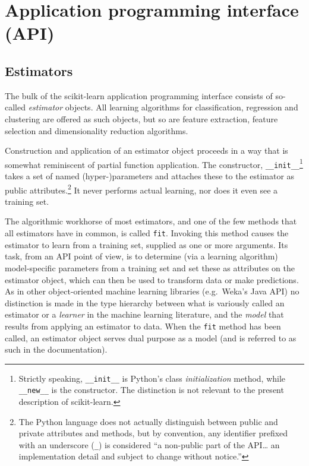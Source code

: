 \documentclass[a4paper]{article}
\begin{document}
\section{Application programming interface (API)}

\subsection{Estimators}


The bulk of the scikit-learn application programming interface
consists of so-called \textit{estimator} objects.
All learning algorithms for classification, regression and clustering
are offered as such objects,
but so are feature extraction, feature selection and dimensionality reduction
algorithms.

Construction and application of an estimator object
proceeds in a way that is somewhat reminiscent of partial function application.
The constructor, \texttt{\_\_init\_\_}\footnote{
  Strictly speaking, \texttt{\_\_init\_\_} is Python's
  class \textit{initialization} method,
  while \texttt{\_\_new\_\_} is the constructor.
  The distinction is not relevant to the present description of scikit-learn.}
takes a set of named (hyper-)parameters
and attaches these to the estimator as public attributes.\footnote{
  The Python language does not actually distinguish between public and private
  attributes and methods,
  but by convention, any identifier prefixed with an underscore (\texttt{\_})
  is considered ``a non-public part of the API\ldots
  an implementation detail and subject to change without notice.''
  }
It never performs actual learning, nor does it even see a training set.

The algorithmic workhorse of most estimators, and one of the few methods
that all estimators have in common, is called \texttt{fit}.
Invoking this method causes the estimator to learn from a training set,
supplied as one or more arguments.
Its task, from an API point of view,
is to determine (via a learning algorithm) model-specific parameters
from a training set and set these as attributes on the estimator object,
which can then be used to transform data or make predictions.
As in other object-oriented machine learning libraries
(e.g.\ Weka's Java API)
no distinction is made in the type hierarchy
between what is variously called an estimator or a \textit{learner}
in the machine learning literature,
and the \textit{model} that results from applying an estimator to data.
When the \texttt{fit} method has been called,
an estimator object serves dual purpose as a model
(and is referred to as such in the documentation).
\end{document}
